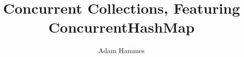 \documentclass[11pt]{beamer}
\title{Concurrent Collections, Featuring ConcurrentHashMap}
\author{Adam Hammes}
\begin{document}
    \begin{frame}
        \titlepage
    \end{frame}
\end{document}
